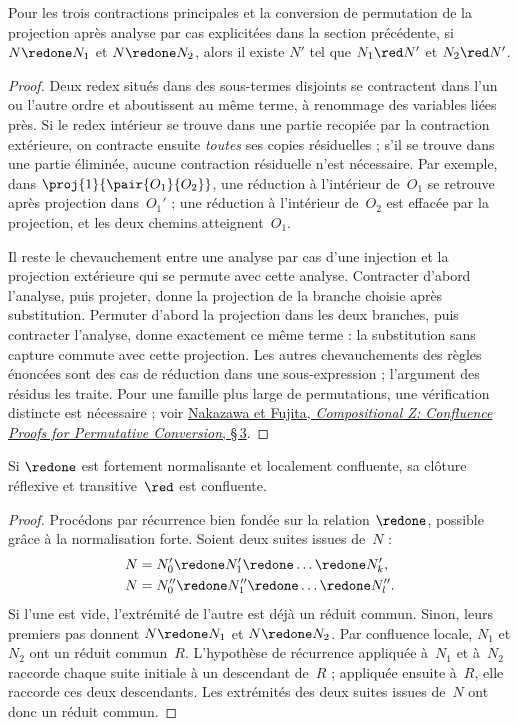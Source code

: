 \documentclass[../../../include/open-logic-section]{subfiles}
\begin{document}
\begin{prop}
  Pour les trois contractions principales et la
  conversion de permutation de la projection après
  analyse par cas explicitées dans la section précédente,
  si $N \redone N_1$ et $N \redone N_2$, alors
  il existe $N'$ tel que $N_1 \red N'$ et
  $N_2 \red N'$.
\end{prop}
\begin{proof}
  Deux redex situés dans des sous-termes disjoints
  se contractent dans l'un ou l'autre ordre et
  aboutissent au même terme, à renommage des variables
  liées près. Si le redex intérieur se trouve dans une
  partie recopiée par la contraction extérieure, on
  contracte ensuite \emph{toutes} ses copies résiduelles ;
  s'il se trouve dans une partie éliminée, aucune
  contraction résiduelle n'est nécessaire.
  Par exemple, dans $\proj{1}{\pair{O_1}{O_2}}$,
  une réduction à l'intérieur de~$O_1$ se retrouve
  après projection dans~$O_1'$ ; une réduction à
  l'intérieur de~$O_2$ est effacée par la projection,
  et les deux chemins atteignent~$O_1$.

  Il reste le chevauchement entre une analyse par cas
  d'une injection et la projection extérieure qui
  se permute avec cette analyse. Contracter d'abord
  l'analyse, puis projeter, donne la projection de
  la branche choisie après substitution. Permuter
  d'abord la projection dans les deux branches, puis
  contracter l'analyse, donne exactement ce même terme :
  la substitution sans capture commute avec cette
  projection. Les autres chevauchements des règles
  énoncées sont des cas de réduction dans une
  sous-expression ; l'argument des résidus les traite.
  Pour une famille plus large de permutations, une
  vérification distincte est nécessaire ; voir
  \href{https://jssst.or.jp/files/user/taikai/2015/PPL/ppl4-3.pdf}
  {Nakazawa et Fujita, \emph{Compositional Z:
  Confluence Proofs for Permutative Conversion},
  §\,3}.
\end{proof}

\begin{lem}
  Si $\redone$ est fortement normalisante et localement
  confluente, sa clôture réflexive et transitive~$\red$
  est confluente.
\end{lem}
\begin{proof}
  Procédons par récurrence bien fondée sur la relation
  $\redone$, possible grâce à la normalisation forte.
  Soient deux suites issues de~$N$ :
  \begin{align*}
    N &= N_0' \redone N_1' \redone \dots
      \redone N_k',\\
    N &= N_0'' \redone N_1'' \redone \dots
      \redone N_l''.
  \end{align*}
  Si l'une est vide, l'extrémité de l'autre
  est déjà un réduit commun.
  Sinon, leurs premiers pas
  donnent $N\redone N_1$ et $N\redone N_2$.
  Par confluence locale, $N_1$ et $N_2$ ont un réduit
  commun~$R$. L'hypothèse de récurrence appliquée
  à~$N_1$ et à~$N_2$ raccorde chaque suite initiale
  à un descendant de~$R$ ; appliquée ensuite à~$R$,
  elle raccorde ces deux descendants. Les extrémités
  des deux suites issues de~$N$ ont donc un réduit commun.
\end{proof}
\end{document}
